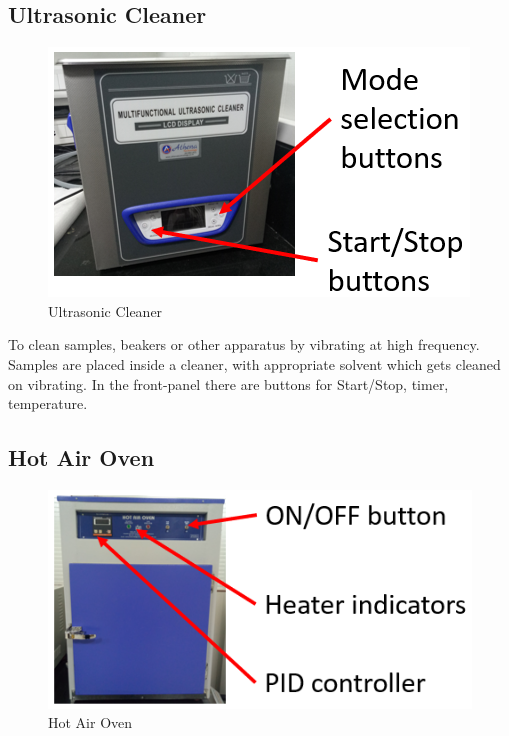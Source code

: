 \subsection{Ultrasonic Cleaner}
\begin{figure}[H]
	\centering
   \includegraphics[scale=0.56]{Images/7.png} 
   \caption{Ultrasonic Cleaner}
\end{figure}
To clean samples, beakers or other apparatus by vibrating at high frequency. Samples are placed inside a cleaner, with appropriate solvent which gets cleaned on vibrating. In the front-panel there are buttons for Start/Stop, timer, temperature.   

\subsection{Hot Air Oven}
\begin{figure}[H]
	\centering
   \includegraphics[scale=0.56]{Images/8.png} 
   \caption{Hot Air Oven}
\end{figure}


